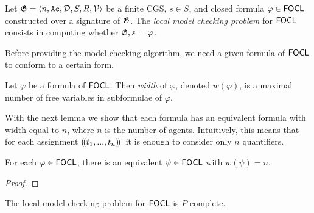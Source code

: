 \documentclass[sigconf,anonymous]{aamas}
\begin{document}
\begin{definition}
    Let $\mathfrak{G} = \langle n,\texttt{Ac}, \mathcal{D}, S,R, \mathcal{V}  \rangle$ be a finite CGS, $s \in S$, and closed formula $\varphi \in \mathsf{FOCL}$ constructed over a signature of $\mathfrak{G}$. The \emph{local model checking problem} for $\mathsf{FOCL}$ consists in computing whether $\mathfrak{G}, s \models \varphi$.
\end{definition}


\iffalse
Before providing the model-checking algorithm, we need a given formula of $\mathsf{FOCL}$ to conform to a certain form. 

\begin{definition}
    Let $\varphi$ be a formula of $\mathsf{FOCL}$. Then \emph{width} of $\varphi$, denoted $w(\varphi)$, is a maximal number of free variables in subformulae of $\varphi$.
\end{definition}

With the next lemma we show that each formula has an equivalent formula with width equal to $n$, where $n$ is the number of agents. Intuitively, this means that for each assignment $(\!( t_1, ..., t_n )\!)\,$ it is enough to consider only $n$ quantifiers.

\begin{lemma}
    For each $\varphi \in \mathsf{FOCL}$, there is an equivalent $\psi \in \mathsf{FOCL}$ with $w(\psi) = n$.
\end{lemma}

\begin{proof}
    
\end{proof}

\begin{theorem}
    The local model checking problem for $\mathsf{FOCL}$ is $P$-complete.
\end{theorem}
\end{document}
